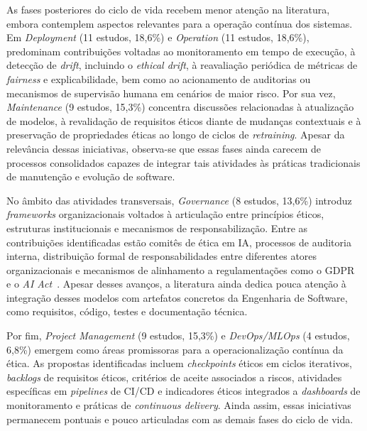 As fases posteriores do ciclo de vida recebem menor atenção na literatura, embora contemplem aspectos relevantes para a operação contínua dos sistemas. Em \textit{Deployment} (11 estudos, 18,6\%) e \textit{Operation} (11 estudos, 18,6\%), predominam contribuições voltadas ao monitoramento em tempo de execução, à detecção de \textit{drift}, incluindo o \textit{ethical drift}, à reavaliação periódica de métricas de \textit{fairness} e explicabilidade, bem como ao acionamento de auditorias ou mecanismos de supervisão humana em cenários de maior risco. Por sua vez, \textit{Maintenance} (9 estudos, 15,3\%) concentra discussões relacionadas à atualização de modelos, à revalidação de requisitos éticos diante de mudanças contextuais e à preservação de propriedades éticas ao longo de ciclos de \textit{retraining}. Apesar da relevância dessas iniciativas, observa-se que essas fases ainda carecem de processos consolidados capazes de integrar tais atividades às práticas tradicionais de manutenção e evolução de software.

No âmbito das atividades transversais, \textit{Governance} (8 estudos, 13,6\%) introduz \textit{frameworks} organizacionais voltados à articulação entre princípios éticos, estruturas institucionais e mecanismos de responsabilização. Entre as contribuições identificadas estão comitês de ética em IA, processos de auditoria interna, distribuição formal de responsabilidades entre diferentes atores organizacionais e mecanismos de alinhamento a regulamentações como o GDPR~\cite{GDPR2016} e o \textit{AI Act}~\cite{EUAIAct2024}. Apesar desses avanços, a literatura ainda dedica pouca atenção à integração desses modelos com artefatos concretos da Engenharia de Software, como requisitos, código, testes e documentação técnica.

Por fim, \textit{Project Management} (9 estudos, 15,3\%) e \textit{DevOps/MLOps} (4 estudos, 6,8\%) emergem como áreas promissoras para a operacionalização contínua da ética. As propostas identificadas incluem \textit{checkpoints} éticos em ciclos iterativos, \textit{backlogs} de requisitos éticos, critérios de aceite associados a riscos, atividades específicas em \textit{pipelines} de CI/CD e indicadores éticos integrados a \textit{dashboards} de monitoramento e práticas de \textit{continuous delivery}. Ainda assim, essas iniciativas permanecem pontuais e pouco articuladas com as demais fases do ciclo de vida.

